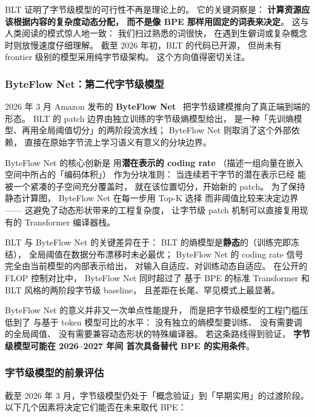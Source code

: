 \begin{corebox}
BLT 证明了字节级模型的可行性不再是理论上的。
它的关键洞察是：
\textbf{计算资源应该根据内容的复杂度动态分配，
而不是像 BPE 那样用固定的词表来决定}。
这与人类阅读的模式惊人地一致：
我们扫过熟悉的词很快，
在遇到生僻词或复杂概念时则放慢速度仔细理解。
截至 2026 年初，BLT 的代码已开源，
但尚未有 frontier 级别的模型采用纯字节级架构。
这个方向值得密切关注。
\end{corebox}

\subsubsection{ByteFlow Net：第二代字节级模型}

2026 年 3 月 Amazon 发布的 \textbf{ByteFlow Net}~\cite{amazon2026byteflow}
把字节级建模推向了真正端到端的形态。
BLT 的 patch 边界由独立训练的字节级熵模型给出，
是一种「先训熵模型、再用全局阈值切分」的两阶段流水线；
ByteFlow Net 则取消了这个外部依赖，
直接在原始字节流上学习语义有意义的分块边界。

ByteFlow Net 的核心创新是
用\textbf{潜在表示的 coding rate}
（描述一组向量在嵌入空间中所占的「编码体积」）
作为分块准则：
当连续若干字节的潜在表示已经
能被一个紧凑的子空间充分覆盖时，
就在该位置切分，开始新的 patch。
为了保持静态计算图，
ByteFlow Net 在每一步用 Top-K 选择
而非阈值比较来决定边界——
这避免了动态形状带来的工程复杂度，
让字节级 patch 机制可以直接复用现有的 Transformer 编译器栈。

BLT 与 ByteFlow Net 的关键差异在于：
BLT 的熵模型是\textbf{静态}的（训练完即冻结），
全局阈值在数据分布漂移时未必最优；
ByteFlow Net 的 coding rate 信号
完全由当前模型的内部表示给出，
对输入自适应、对训练动态自适应。
在公开的 FLOP 控制对比中，
ByteFlow Net 同时超过了
基于 BPE 的标准 Transformer
和 BLT 风格的两阶段字节级 baseline，
且差距在长尾、罕见模式上最显著。

ByteFlow Net 的意义并非又一次单点性能提升，
而是把字节级模型的工程门槛压低到了
与基于 token 模型可比的水平：
没有独立的熵模型要训练、
没有需要调的全局阈值、
没有需要兼容动态形状的特殊编译器。
若这条路线得到验证，
\textbf{字节级模型可能在 2026--2027 年间
首次具备替代 BPE 的实用条件}。

\subsubsection{字节级模型的前景评估}

截至 2026 年 3 月，字节级模型仍处于「概念验证」到「早期实用」的过渡阶段。以下几个因素将决定它们能否在未来取代 BPE：

